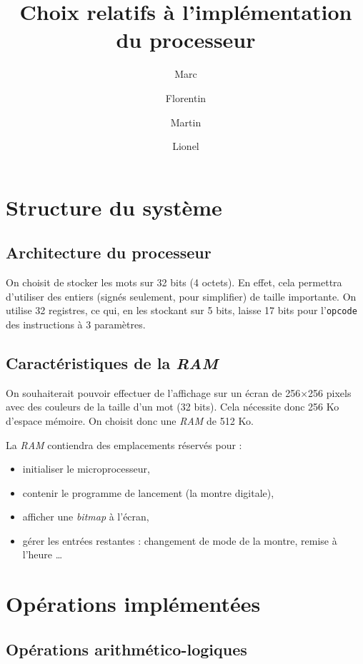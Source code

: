 \documentclass[a4paper, 10pt, french]{article}
\title{Choix relatifs à l'implémentation du processeur}
\author{Marc \bsc{Ducret} \and Florentin \bsc{Guth} \and Martin \bsc{Ruffel} \and Lionel \bsc{Zoubritzky}}
\newcommand{\code}[1]{\texttt{#1}}
\begin{document}
\maketitle

\section{Structure du système}

\subsection{Architecture du processeur}

On choisit de stocker les mots sur 32 bits (4 octets). En effet, cela permettra d'utiliser des entiers (signés seulement, pour simplifier) de taille importante. On utilise 32 registres, ce qui, en les stockant sur 5 bits, laisse 17 bits pour l'\code{opcode} des instructions à 3 paramètres.

\subsection{Caractéristiques de la \emph{RAM}}

On souhaiterait pouvoir effectuer de l'affichage sur un écran de 256$\times$256 pixels avec des couleurs de la taille d'un mot (32 bits). Cela nécessite donc 256 Ko d'espace mémoire. On choisit donc une \emph{RAM} de 512 Ko.

La \emph{RAM} contiendra des emplacements réservés pour :
\begin{itemize}
  \item initialiser le microprocesseur,
  \item contenir le programme de lancement (la montre digitale),
  \item afficher une \emph{bitmap} à l'écran,
  \item gérer les entrées restantes : changement de mode de la montre, remise à l'heure \ldots
\end{itemize}


\section{Opérations implémentées}

\subsection{Opérations arithmético-logiques}
\end{document}
